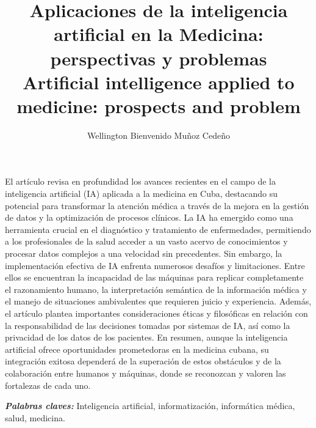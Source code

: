 \documentclass[a4paper,10pt]{article}
\title{Aplicaciones de la inteligencia artificial en la Medicina: 
perspectivas y problemas \\ \vspace{1cm} Artificial intelligence applied to medicine: prospects and problem}
\author[1,*]{Wellington Bienvenido Muñoz Cedeño}
\affil[1]{Universidad Laica "Eloy Alfaro" de Manabí, El Carmen, Ecuador}
\date{}
\renewenvironment{abstract}
 {\small
  \begin{center}
  \bfseries \abstractname\vspace{-.5em}\vspace{0pt}
  \end{center}
  \list{}{%
    \setlength{\leftmargin}{4mm}%
    \setlength{\rightmargin}{\leftmargin}%
  }%
  \item\relax}
 {\endlist}
\providecommand{\keywords}[2]
{
  \hfill \break
  \small	
  \textbf{\textit{#1:}} #2
}
\begin{document}
\maketitle
\thispagestyle{firstpage}

\begin{abstract}
El artículo revisa en profundidad los avances recientes en el campo de la inteligencia artificial (IA) aplicada a la medicina en Cuba, destacando su potencial para transformar la atención médica a través de la mejora en la gestión de datos y la optimización de procesos clínicos. La IA ha emergido como una herramienta crucial en el diagnóstico y tratamiento de enfermedades, permitiendo a los profesionales de la salud acceder a un vasto acervo de conocimientos y procesar datos complejos a una velocidad sin precedentes. Sin embargo, la implementación efectiva de IA enfrenta numerosos desafíos y limitaciones. Entre ellos se encuentran la incapacidad de las máquinas para replicar completamente el razonamiento humano, la interpretación semántica de la información médica y el manejo de situaciones ambivalentes que requieren juicio y experiencia. Además, el artículo plantea importantes consideraciones éticas y filosóficas en relación con la responsabilidad de las decisiones tomadas por sistemas de IA, así como la privacidad de los datos de los pacientes. En resumen, aunque la inteligencia artificial ofrece oportunidades prometedoras en la medicina cubana, su integración exitosa dependerá de la superación de estos obstáculos y de la colaboración entre humanos y máquinas, donde se reconozcan y valoren las fortalezas de cada uno.

    

\keywords{Palabras claves}{Inteligencia artificial, informatización, informática médica, salud, medicina.}
\end{abstract}
\end{document}
